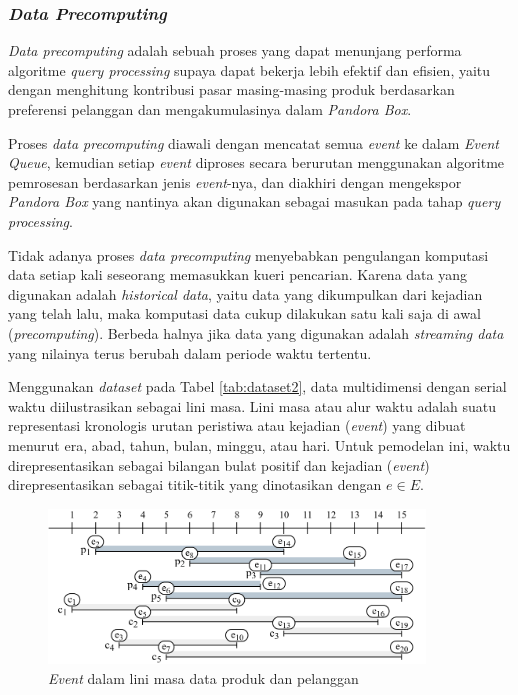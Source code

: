 \subsubsection{\textit{Data Precomputing}}
\tab \textit{Data precomputing} adalah sebuah proses yang dapat menunjang performa algoritme \textit{query processing} supaya dapat bekerja lebih efektif dan efisien, yaitu dengan menghitung kontribusi pasar masing-masing produk berdasarkan preferensi pelanggan dan mengakumulasinya dalam \textit{Pandora Box}. 

Proses \textit{data precomputing} diawali dengan mencatat semua \textit{event} ke dalam \textit{Event Queue}, kemudian setiap \textit{event} diproses secara berurutan menggunakan algoritme pemrosesan berdasarkan jenis \textit{event}-nya, dan diakhiri dengan mengekspor \textit{Pandora Box} yang nantinya akan digunakan sebagai masukan pada tahap \textit{query processing}. 

Tidak adanya proses \textit{data precomputing} menyebabkan pengulangan komputasi data setiap kali seseorang memasukkan kueri pencarian. Karena data yang digunakan adalah \textit{historical data}, yaitu data yang dikumpulkan dari kejadian yang telah lalu, maka komputasi data cukup dilakukan satu kali saja di awal (\textit{precomputing}). Berbeda halnya jika data yang digunakan adalah \textit{streaming data} yang nilainya terus berubah dalam periode waktu tertentu.

Menggunakan \textit{dataset} pada Tabel \ref{tab:dataset2}, data multidimensi dengan serial waktu diilustrasikan sebagai lini masa. Lini masa atau alur waktu adalah suatu representasi kronologis urutan peristiwa atau kejadian (\textit{event}) yang dibuat menurut era, abad, tahun, bulan, minggu, atau hari. Untuk pemodelan ini, waktu direpresentasikan sebagai bilangan bulat positif dan kejadian (\textit{event}) direpresentasikan sebagai titik-titik yang dinotasikan dengan $e \in E$. 
\begin{figure}[H]
	\centering
	\includegraphics[width=10cm]{assets/img/bab3/timeline-event.png}
	\caption{\textit{Event} dalam lini masa data produk dan pelanggan}
	\label{fig:timeline-event}
\end{figure}

